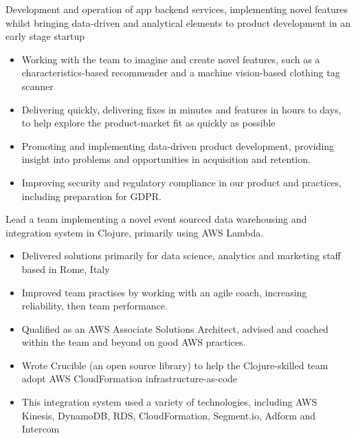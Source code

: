 \documentclass[11pt,a4paper,sans]{moderncv}        %
\begin{document}
{Development and operation of app backend services, implementing novel features whilst bringing data-driven and analytical elements to product development in an early stage startup
\newline{}
\begin{itemize}
\item Working with the team to imagine and create novel features, such as a characteristics-based recommender and a machine vision-based clothing tag scanner
\item Delivering quickly, delivering fixes in minutes and features in hours to days, to help explore the product-market fit as quickly as possible
\item Promoting and implementing data-driven product development, providing insight into problems and opportunities in acquisition and retention.
\item Improving security and regulatory compliance in our product and practices, including preparation for GDPR.
\end{itemize}
}
{Lead a team implementing a novel event sourced data warehousing and integration system in Clojure, primarily using AWS Lambda.
\newline{}
\begin{itemize}
\item Delivered solutions primarily for data science, analytics and marketing staff based in Rome, Italy
\item Improved team practises by working with an agile coach, increasing reliability, then team performance.
\item Qualified as an AWS Associate Solutions Architect, advised and coached within the team and beyond on good AWS practices.
\item Wrote Crucible (an open source library) to help the Clojure-skilled team adopt AWS CloudFormation infrastructure-as-code
\item This integration system used a variety of technologies, including AWS Kinesis, DynamoDB, RDS, CloudFormation, Segment.io, Adform and Intercom
\end{itemize}
}
\end{document}
